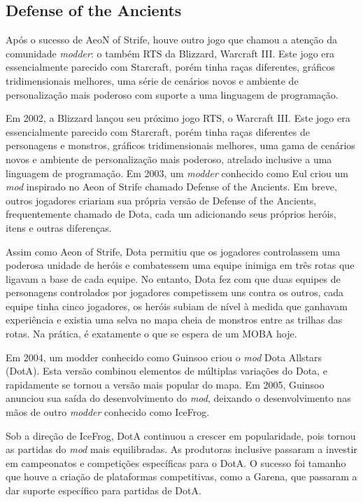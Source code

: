 \subsection{Defense of the Ancients}
Após o sucesso de AeoN of Strife, houve outro jogo que chamou a atenção da comunidade \textit{modder}: o também RTS da Blizzard, Warcraft III. Este jogo era essencialmente parecido com Starcraft, porém tinha raças diferentes, gráficos tridimensionais melhores, uma série de cenários novos e ambiente de personalização mais poderoso com suporte a uma linguagem de programação.

Em 2002, a Blizzard lançou seu próximo jogo RTS, o Warcraft III. Este jogo era essencialmente parecido com Starcraft, porém tinha raças diferentes de personagens e monstros, gráficos tridimensionais melhores, uma gama de cenários novos e ambiente de personalização mais poderoso, atrelado inclusive a uma linguagem de programação. Em 2003, um \textit{modder} conhecido como Eul criou um \textit{mod} inspirado no Aeon of Strife chamado Defense of the Ancients. Em breve, outros jogadores criariam sua própria versão de Defense of the Ancients, frequentemente chamado de Dota, cada um adicionando seus próprios heróis, itens e outras diferenças.

Assim como Aeon of Strife, Dota permitiu que os jogadores controlassem uma poderosa unidade de heróis e combatessem uma equipe inimiga em três rotas que ligavam a base de cada equipe. No entanto, Dota fez com que duas equipes de personagens controlados por jogadores competissem uns contra os outros, cada equipe tinha cinco jogadores, os heróis subiam de nível à medida que ganhavam experiência e existia uma selva no mapa cheia de monstros entre as trilhas das rotas. Na prática, é exatamente o que se espera de um MOBA hoje.

Em 2004, um modder conhecido como Guinsoo criou o \textit{mod} Dota Allstars (DotA). Esta versão combinou elementos de múltiplas variações do Dota, e rapidamente se tornou a versão mais popular do mapa. Em 2005, Guinsoo anunciou sua saída do desenvolvimento do \textit{mod}, deixando o desenvolvimento nas mãos de outro \textit{modder} conhecido como IceFrog.

Sob a direção de IceFrog, DotA continuou a crescer em popularidade, pois tornou as partidas do \textit{mod} mais equilibradas. As produtoras inclusive passaram a investir em campeonatos e competições específicas para o DotA. O sucesso foi tamanho que houve a criação de plataformas competitivas, como a Garena, que passaram a dar suporte específico para partidas de DotA.

